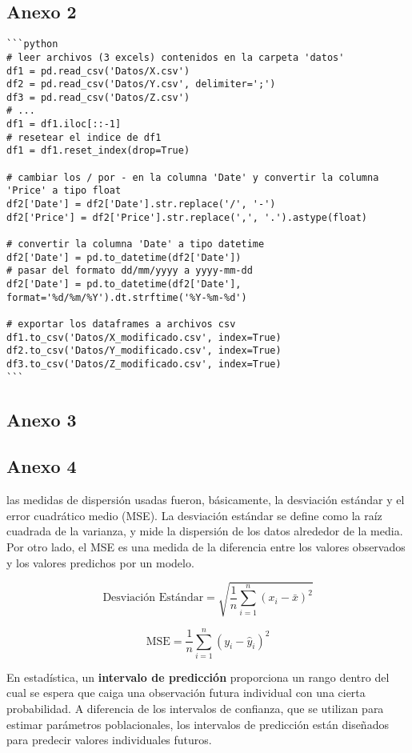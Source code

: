 \subsection{Anexo 2}\label{anexo-2}

\begin{verbatim}
```python
# leer archivos (3 excels) contenidos en la carpeta 'datos'
df1 = pd.read_csv('Datos/X.csv')
df2 = pd.read_csv('Datos/Y.csv', delimiter=';')
df3 = pd.read_csv('Datos/Z.csv')
# ...
df1 = df1.iloc[::-1]
# resetear el indice de df1
df1 = df1.reset_index(drop=True)

# cambiar los / por - en la columna 'Date' y convertir la columna 'Price' a tipo float
df2['Date'] = df2['Date'].str.replace('/', '-')
df2['Price'] = df2['Price'].str.replace(',', '.').astype(float)

# convertir la columna 'Date' a tipo datetime
df2['Date'] = pd.to_datetime(df2['Date'])
# pasar del formato dd/mm/yyyy a yyyy-mm-dd
df2['Date'] = pd.to_datetime(df2['Date'], format='%d/%m/%Y').dt.strftime('%Y-%m-%d')

# exportar los dataframes a archivos csv
df1.to_csv('Datos/X_modificado.csv', index=True)
df2.to_csv('Datos/Y_modificado.csv', index=True)
df3.to_csv('Datos/Z_modificado.csv', index=True)
```
\end{verbatim}

\subsection{Anexo 3}\label{anexo-3}

\subsection{Anexo 4}\label{anexo-4}

las medidas de dispersión usadas fueron, básicamente, la desviación
estándar y el error cuadrático medio (MSE). La desviación estándar se
define como la raíz cuadrada de la varianza, y mide la dispersión de los
datos alrededor de la media. Por otro lado, el MSE es una medida de la
diferencia entre los valores observados y los valores predichos por un
modelo.

\[
\text{Desviación Estándar} = \sqrt{\frac{1}{n} \sum_{i=1}^{n} (x_i - \bar{x})^2}
\]

\[
\text{MSE} = \frac{1}{n} \sum_{i=1}^{n} (y_i - \hat{y}_i)^2
\]

En estadística, un \textbf{intervalo de predicción} proporciona un rango
dentro del cual se espera que caiga una observación futura individual
con una cierta probabilidad. A diferencia de los intervalos de
confianza, que se utilizan para estimar parámetros poblacionales, los
intervalos de predicción están diseñados para predecir valores
individuales futuros.

